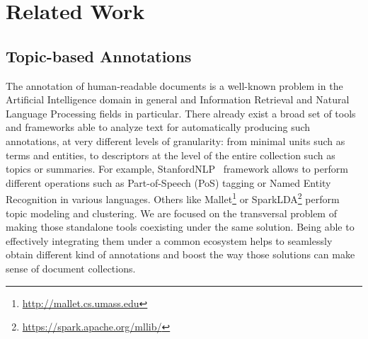 

\chapter{Related Work}\label{ch:soa}

\graphicspath{{soa/figures/}}



\section{Topic-based Annotations}

The annotation of human-readable documents is a well-known problem in the Artificial Intelligence domain in general and Information Retrieval and Natural Language Processing fields in particular. There already exist a broad set of tools and frameworks able to analyze text for automatically producing such annotations, at very different levels of granularity: from minimal units such as terms and entities, to descriptors at the level of the entire collection such as  topics or summaries. For example, StanfordNLP~\cite{Manning2014TheToolkit} framework allows to perform different operations such as Part-of-Speech (PoS) tagging or Named Entity Recognition in various languages. Others like Mallet\footnote{\url{http://mallet.cs.umass.edu}} or SparkLDA\footnote{\url{https://spark.apache.org/mllib/}} perform topic modeling and clustering. We are focused on the transversal problem of making those standalone tools coexisting under the same solution. Being able to effectively integrating  them  under a common ecosystem helps to seamlessly obtain different kind of  annotations and boost the way those solutions can make sense of document collections.  
 
